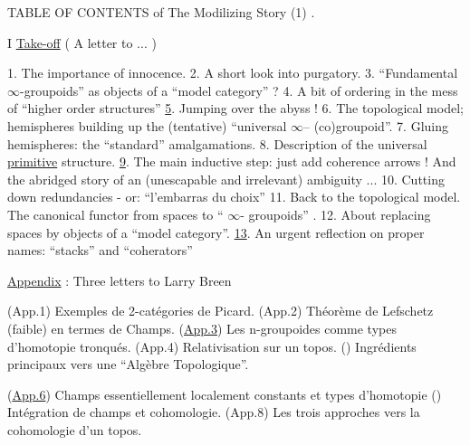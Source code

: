 

TABLE OF CONTENTS of The Modilizing Story (1) .

I \uline{Take-off} ( A letter to ... )

1. The importance of innocence.
2. A short look into purgatory.
3. ``Fundamental $\infty$-groupoids'' as objects of a ``model category'' ?
4. A bit of ordering in the mess of ``higher order structures''
\uline{5}. Jumping over the abyss !
6. The topological model; hemispheres building up the (tentative)
``universal $\infty$-- (co)groupoid''.
7. Gluing hemispheres: the ``standard'' amalgamations.
8. Description of the universal \uline{primitive} structure.
\uline{9}. The main inductive step: just add coherence arrows ! And the
abridged story of an (unescapable and irrelevant) ambiguity ...
10. Cutting down redundancies - or: ``l'embarras du choix''
\unsure{\hand{\textasciicircum}}11. Back to the topological model. The canonical functor from
spaces to `` $\infty$- groupoids'' .
12. About replacing spaces by objects of a ``model category''.
\uline{13}. An urgent reflection on proper names: ``stacks'' and ``coherators''

\uline{Appendix} : Three letters to Larry Breen

(App.1) Exemples de 2-catégories de Picard.
(App.2)  Théorème de Lefschetz (faible) en termes de \hand{(}Champs.\hand{)}
(\uline{App.3}) Les n-groupoides comme types d'homotopie tronqués.
(App.4) Relativisation sur un topos.
() Ingrédients principaux vers une ``Algèbre Topologique''.

(\uline{App.6}) Champs essentiellement localement constants et types d'homoto\hand{(}pie
() Intégration de champs et cohomologie.
(App.8) Les trois approches vers la cohomologie d'un topos.

